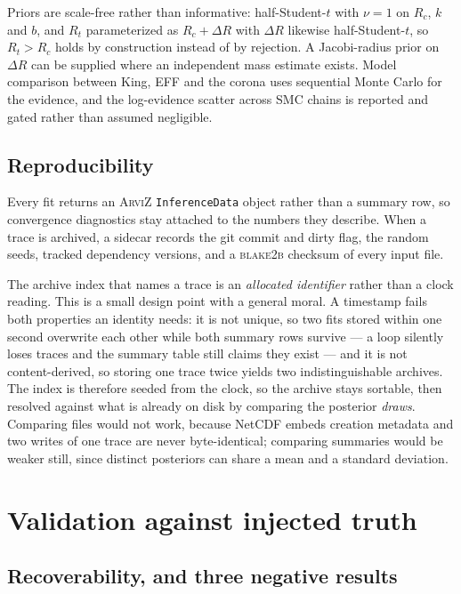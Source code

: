 \documentclass{aa}
\begin{document}
Priors are scale-free rather than informative: half-Student-$t$ with $\nu = 1$ on $R_c$, $k$ and
$b$, and $R_t$ parameterized as $R_c + \Delta R$ with $\Delta R$ likewise half-Student-$t$, so
$R_t > R_c$ holds by construction instead of by rejection. A Jacobi-radius prior on $\Delta R$ can
be supplied where an independent mass estimate exists. Model comparison between King, EFF and the
corona uses sequential Monte Carlo for the evidence, and the log-evidence scatter across SMC
chains is reported and gated rather than assumed negligible.

\subsection{Reproducibility}
\label{sec:repro}

Every fit returns an \textsc{ArviZ} \texttt{InferenceData} object rather than a summary row, so
convergence diagnostics stay attached to the numbers they describe. When a trace is archived, a
sidecar records the git commit and dirty flag, the random seeds, tracked dependency versions,
and a \textsc{blake2b} checksum of every input file.

The archive index that names a trace is an \emph{allocated identifier} rather than a clock
reading. This is a small design point with a general moral. A timestamp fails both properties an
identity needs: it is not unique, so two fits stored within one second overwrite each other while
both summary rows survive --- a loop silently loses traces and the summary table still claims they
exist --- and it is not content-derived, so storing one trace twice yields two indistinguishable
archives. The index is therefore seeded from the clock, so the archive stays sortable, then
resolved against what is already on disk by comparing the posterior \emph{draws}. Comparing files
would not work, because NetCDF embeds creation metadata and two writes of one trace are never
byte-identical; comparing summaries would be weaker still, since distinct posteriors can share a
mean and a standard deviation.

\section{Validation against injected truth}
\label{sec:validation}

\subsection{Recoverability, and three negative results}
\label{sec:recoverability}
\end{document}
